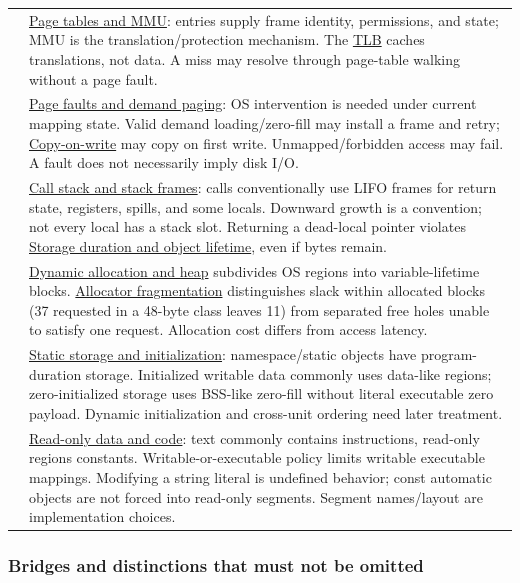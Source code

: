 {\begin{longtable}[]{@{}
  >{\raggedright\arraybackslash}p{}
  >{\raggedright\arraybackslash}p{}@{}}
55 & \hyperref[appendix-01e5905165c4]{Page tables and MMU}: entries supply frame identity, permissions, and state; MMU is the translation/protection mechanism. The \hyperref[appendix-7a2d9c5ce511]{TLB} caches translations, not data. A miss may resolve through page-table walking without a page fault. \\
56 & \hyperref[appendix-cc0909a7ef14]{Page faults and demand paging}: OS intervention is needed under current mapping state. Valid demand loading/zero-fill may install a frame and retry; \hyperref[appendix-7a06e5baac04]{Copy-on-write} may copy on first write. Unmapped/forbidden access may fail. A fault does not necessarily imply disk I/O. \\
57 & \hyperref[appendix-b081b7abe193]{Call stack and stack frames}: calls conventionally use LIFO frames for return state, registers, spills, and some locals. Downward growth is a convention; not every local has a stack slot. Returning a dead-local pointer violates \hyperref[appendix-0b104bcba06b]{Storage duration and object lifetime}, even if bytes remain. \\
58 & \hyperref[appendix-c3480f7d9ff3]{Dynamic allocation and heap} subdivides OS regions into variable-lifetime blocks. \hyperref[appendix-a7c50686d81f]{Allocator fragmentation} distinguishes slack within allocated blocks (37 requested in a 48-byte class leaves 11) from separated free holes unable to satisfy one request. Allocation cost differs from access latency. \\
59 & \hyperref[appendix-17c93c4c2f19]{Static storage and initialization}: namespace/static objects have program-duration storage. Initialized writable data commonly uses data-like regions; zero-initialized storage uses BSS-like zero-fill without literal executable zero payload. Dynamic initialization and cross-unit ordering need later treatment. \\
60 & \hyperref[appendix-5f9e5e2f0a5e]{Read-only data and code}: text commonly contains instructions, read-only regions constants. Writable-or-executable policy limits writable executable mappings. Modifying a string literal is undefined behavior; const automatic objects are not forced into read-only segments. Segment names/layout are implementation choices. \\
\end{longtable}
}

\subsubsection{Bridges and distinctions that must not be omitted}\label{appendix-fd090d982a15-bridges-and-distinctions-that-must-not-be-omitted}

